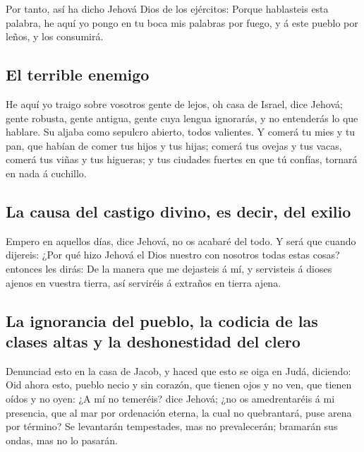  Por tanto, así ha dicho Jehová Dios de los ejércitos:
Porque hablasteis esta palabra, he aquí yo pongo en tu boca mis palabras
por fuego, y á este pueblo por leños, y los consumirá.

\hypertarget{el-terrible-enemigo}{%
\subsection{El terrible enemigo}\label{el-terrible-enemigo}}

 He aquí yo traigo sobre vosotros gente de lejos, oh casa
de Israel, dice Jehová; gente robusta, gente antigua, gente cuya lengua
ignorarás, y no entenderás lo que hablare.  Su aljaba
como sepulcro abierto, todos valientes.  Y comerá tu mies
y tu pan, que habían de comer tus hijos y tus hijas; comerá tus ovejas y
tus vacas, comerá tus viñas y tus higueras; y tus ciudades fuertes en
que tú confías, tornará en nada á cuchillo.

\hypertarget{la-causa-del-castigo-divino-es-decir-del-exilio}{%
\subsection{La causa del castigo divino, es decir, del
exilio}\label{la-causa-del-castigo-divino-es-decir-del-exilio}}

 Empero en aquellos días, dice Jehová, no os acabaré del
todo.  Y será que cuando dijereis: ¿Por qué hizo Jehová
el Dios nuestro con nosotros todas estas cosas? entonces les dirás: De
la manera que me dejasteis á mí, y servisteis á dioses ajenos en vuestra
tierra, así serviréis á extraños en tierra ajena.

\hypertarget{la-ignorancia-del-pueblo-la-codicia-de-las-clases-altas-y-la-deshonestidad-del-clero}{%
\subsection{La ignorancia del pueblo, la codicia de las clases altas y
la deshonestidad del
clero}\label{la-ignorancia-del-pueblo-la-codicia-de-las-clases-altas-y-la-deshonestidad-del-clero}}

 Denunciad esto en la casa de Jacob, y haced que esto se
oiga en Judá, diciendo:  Oid ahora esto, pueblo necio y
sin corazón, que tienen ojos y no ven, que tienen oídos y no oyen:
 ¿A mí no temeréis? dice Jehová; ¿no os amedrentaréis á
mi presencia, que al mar por ordenación eterna, la cual no quebrantará,
puse arena por término? Se levantarán tempestades, mas no prevalecerán;
bramarán sus ondas, mas no lo pasarán.

